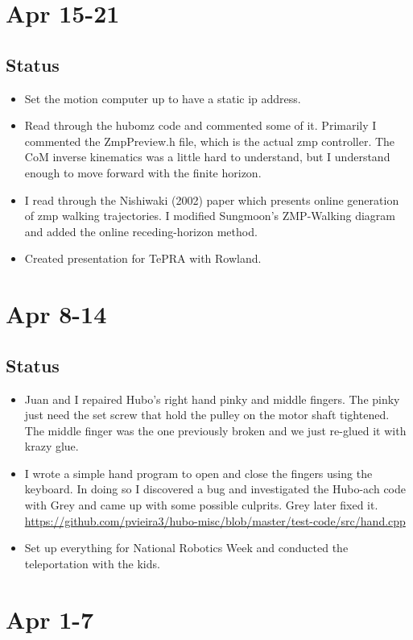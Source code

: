 \documentclass[letterpaper, 10 pt]{report}
\begin{document}
\section*{Apr 15-21}
\subsection*{Status}
\begin{itemize}
\item Set the motion computer up to have a static ip address.
\item Read through the hubomz code and commented some of it. Primarily I commented the
ZmpPreview.h file, which is the actual zmp controller. The CoM inverse
kinematics was a little hard to understand, but I understand enough to move
forward with the finite horizon.
\item I read through the Nishiwaki (2002) paper which presents online generation of 
zmp walking trajectories. I modified Sungmoon's ZMP-Walking diagram and added
the online receding-horizon method.
\item Created presentation for TePRA with Rowland.
\end{itemize}

\section*{Apr 8-14}
\subsection*{Status}
\begin{itemize}
\item Juan and I repaired Hubo's right hand pinky and middle fingers. The pinky
just need the set screw that hold the pulley on the motor shaft tightened. The
middle finger was the one previously broken and we just re-glued it with krazy
glue.
\item I wrote a simple hand program to open and close the fingers using the keyboard.
In doing so I discovered a bug and investigated the Hubo-ach code with Grey and
came up with some possible culprits. Grey later fixed it.
\url{https://github.com/pvieira3/hubo-misc/blob/master/test-code/src/hand.cpp}
\item Set up everything for National Robotics Week and conducted the teleportation
with the kids.
\end{itemize}

\section*{Apr 1-7}
\end{document}
